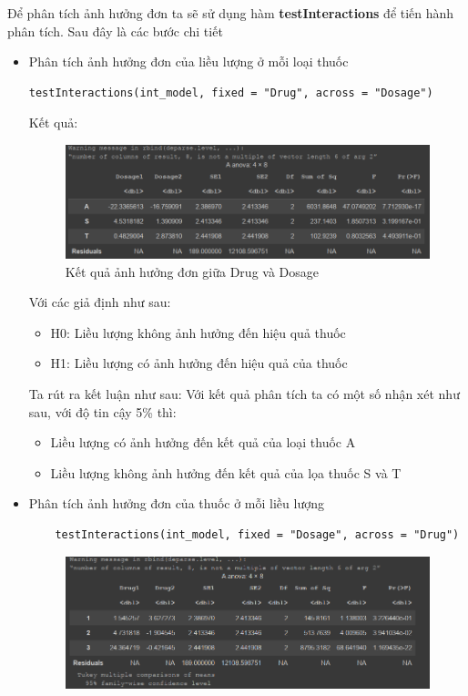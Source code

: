 \begin{itemize}
        Để phân tích ảnh hưởng đơn ta sẽ sử dụng hàm \textbf{testInteractions} để tiến hành phân tích. Sau đây là các bước chi tiết
    \begin{itemize}
        \item Phân tích ảnh hưởng đơn của liều lượng ở mỗi loại thuốc
            \begin{lstlisting}
testInteractions(int_model, fixed = "Drug", across = "Dosage")
            \end{lstlisting}
            Kết quả:
            \begin{figure}[H]
                \centering
                \includegraphics[width=0.8\linewidth]{part01_figures/8.png}
                \caption{Kết quả ảnh hưởng đơn giữa Drug và Dosage}
                \label{fig:Kết quả ảnh hưởng đơn giữa Drug và Dosage}
            \end{figure}
            Với các giả định như sau:
            \begin{itemize}
                \item H0: Liều lượng không ảnh hưởng đến hiệu quả thuốc
                \item H1: Liều lượng có ảnh hưởng đến hiệu quả của thuốc
            \end{itemize}
            Ta rút ra kết luận như sau: Với kết quả phân tích ta có một số nhận xét như sau, với độ tin cậy 5\% thì:
            \begin{itemize}
                \item Liều lượng có ảnh hưởng đến kết quả của loại thuốc A
                \item Liều lượng không ảnh hưởng đến kết quả của lọa thuốc S và T
            \end{itemize}
        \item Phân tích ảnh hưởng đơn của thuốc ở mỗi liều lượng
            \begin{lstlisting}
    testInteractions(int_model, fixed = "Dosage", across = "Drug")
            \end{lstlisting}
            \begin{figure}[H]
                \centering
                \includegraphics[width=0.8\linewidth]{part01_figures/9.png}

\end{figure}
\end{itemize}
\end{itemize}
